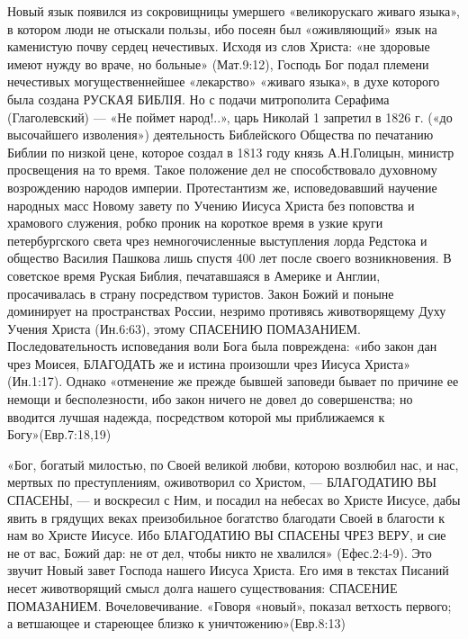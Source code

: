      Новый язык появился из сокровищницы умершего «великорускаго живаго языка», в котором люди не отыскали пользы, ибо посеян был «оживляющий» язык на каменистую почву сердец нечестивых. Исходя из слов Христа: «не здоровые имеют нужду во враче, но больные» (Мат.9:12), Господь Бог подал племени нечестивых могущественнейшее «лекарство» «живаго языка», в духе которого была создана  РУСКАЯ  БИБЛІЯ. Но с подачи митрополита Серафима (Глаголевский) --- «Не поймет народ!..», царь Николай 1 запретил в 1826 г. («до высочайшего изволения») деятельность Библейского Общества по печатанию Библии по низкой цене, которое создал в 1813 году князь А.Н.Голицын, министр просвещения на то время. Такое положение дел не способствовало духовному возрождению народов империи.
Протестантизм же, исповедовавший научение народных масс Новому завету по Учению Иисуса Христа без поповства и храмового служения, робко проник на короткое время в узкие круги петербургского света чрез немногочисленные выступления лорда Редстока и общество Василия Пашкова лишь спустя 400 лет после своего возникновения. В советское время Руская Библия, печатавшаяся в Америке и Англии, просачивалась в страну посредством туристов. Закон Божий и поныне доминирует на пространствах России, незримо противясь животворящему Духу Учения Христа (Ин.6:63), этому  СПАСЕНИЮ  ПОМАЗАНИЕМ. Последовательность исповедания воли Бога была повреждена: «ибо закон дан чрез Моисея,
БЛАГОДАТЬ же и истина произошли чрез Иисуса Христа» (Ин.1:17).  Однако «отменение же прежде бывшей заповеди бывает по причине ее немощи и бесполезности, ибо закон ничего не довел до совершенства; но вводится лучшая надежда, посредством которой мы приближаемся к Богу»(Евр.7:18,19)

    «Бог, богатый милостью, по Своей великой любви, которою возлюбил нас, и нас, мертвых по преступлениям, оживотворил со Христом, --- БЛАГОДАТИЮ ВЫ СПАСЕНЫ, --- и воскресил с Ним, и посадил на небесах во Христе Иисусе, дабы явить в грядущих веках преизобильное богатство благодати Своей в благости к нам во Христе Иисусе. Ибо  БЛАГОДАТИЮ  ВЫ  СПАСЕНЫ  ЧРЕЗ  ВЕРУ,  и сие не от вас, Божий дар:  не от дел, чтобы никто не хвалился» (Ефес.2:4-9).
              Это звучит Новый завет Господа нашего Иисуса Христа.    Его имя в текстах Писаний несет животворящий смысл долга нашего существования:  СПАСЕНИЕ  ПОМАЗАНИЕМ.  Вочеловечивание.
«Говоря «новый», показал ветхость первого; а ветшающее и стареющее близко к уничтожению»(Евр.8:13)

